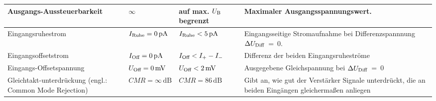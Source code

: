 \begin{frame}
{\begin{tabular}{|L{3cm}|L{3cm}|L{3cm}|L{5cm}|}
            \hline
            Ausgangs-Aussteuerbarkeit                                                     & $\infty$                                 & auf max. $U_{\textnormal{B}}$ begrenzt        & Maximaler Ausgangsspannungswert.                                                                    \\
            \hline
            Eingangsruhestrom                                                                     & $I_{\textnormal{Ruhe}} = 0\,\mathrm{pA}$ & $I_{\textnormal{Ruhe}} < 5\,\mathrm{pA} $     & Eingangsseitige Stromaufnahme bei Differenzspannnung $\Delta U_{\textnormal{Diff}}$~=~0.            \\
            \hline
            Eingangsoffsetstrom                                                                 & $I_{\textnormal{Off}} = 0\,\mathrm{pA}$  & $I_{\textnormal{Off}} < I_+-I_-$              & Differenz der beiden Eingangsruheströme                                                             \\
            \hline
            Eingangs-Offsetspannung                                                         & $U_{\textnormal{Off}} = 0\,\mathrm{mV}$  & $U_{\textnormal{Off}} < 2\,\mathrm{mV}$       & Ausgegebene Gleichspannung bei $\Delta U_{\textnormal{Diff}}$~=~0                                   \\
            \hline
            Gleichtakt-\linebreak unterdrückung (engl.: Common Mode Rejection)   & $CMR = \infty\,\mathrm{dB}$              & $CMR=86\,\mathrm{dB}$                         & Gibt an, wie gut der Verstärker Signale unterdrückt, die an beiden Eingängen gleichermaßen anliegen \\
            \hline
        \end{tabular}
    }
    

\end{frame}
